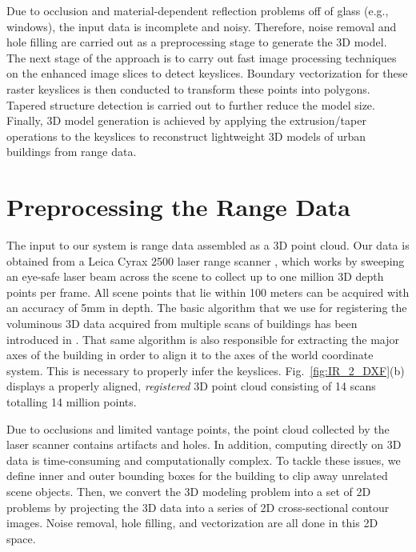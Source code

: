 \documentclass[review]{acmsiggraph}       %
\newcommand{\Figb}[1]{Fig.~\ref{fig:#1}(b)}
\begin{document}
Due to occlusion and material-dependent reflection problems off of glass
(e.g., windows), the input data is incomplete and noisy.
Therefore, noise removal and hole filling are carried out as a
preprocessing stage to generate the 3D model.
The next stage of the approach is to carry out fast image processing
techniques on the enhanced image slices to detect keyslices.
Boundary vectorization for these raster keyslices is then conducted to
transform these points into polygons.
Tapered structure detection is carried out to further reduce the model size.
Finally, 3D model generation is achieved by applying the extrusion/taper
operations to the keyslices to reconstruct lightweight 3D models of urban
buildings from range data.

\section{Preprocessing the Range Data}
\label{sec:prep}

The input to our system is range data assembled as a 3D point cloud.
Our data is obtained from a Leica Cyrax 2500 laser range scanner \cite{RDP_LRS},
which works by sweeping an eye-safe laser beam across the scene to collect
up to one million 3D depth points per frame.
All scene points that lie within 100 meters can be acquired with an accuracy
of 5mm in depth.
The basic algorithm that we use for registering the voluminous 3D data
acquired from multiple scans of buildings has been introduced in
\cite{RDP_LS}.
That same algorithm is also responsible for extracting the major axes
of the building in order to align it to the axes of the world coordinate
system.
This is necessary to properly infer the keyslices.
\Figb{IR_2_DXF} displays a properly aligned, {\it registered} 3D point cloud
consisting of 14 scans totalling 14 million points.

Due to occlusions and limited vantage points, the point cloud collected by the
laser scanner contains artifacts and holes.
In addition, computing directly on 3D data is time-consuming and
computationally complex.
To tackle these issues, we define inner and outer bounding boxes for the
building to clip away unrelated scene objects.
Then, we convert the 3D modeling problem into a set of 2D problems by
projecting the 3D data into a series of 2D cross-sectional contour images.
Noise removal, hole filling, and vectorization are all done in this
2D space.
\end{document}
